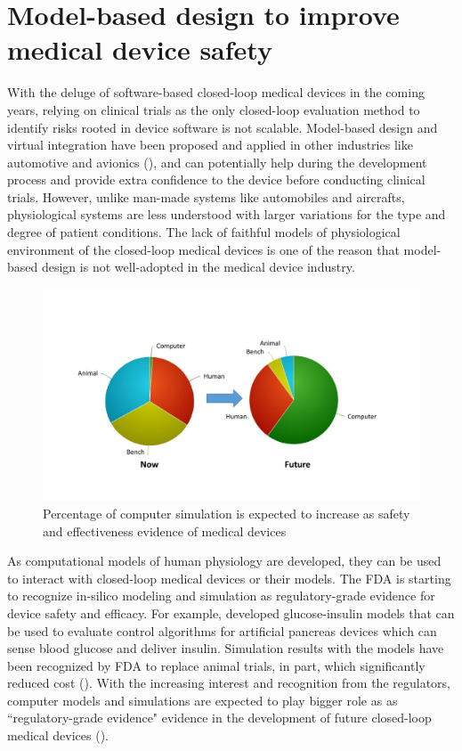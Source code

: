 \section{Model-based design to improve medical device safety}
With the deluge of software-based closed-loop medical devices in the coming years, relying on clinical trials as the only closed-loop evaluation method to identify risks rooted in device software is not scalable. Model-based design and virtual integration have been proposed and applied in other industries like automotive and avionics (\cite{autosar, avsi}), and can potentially help during the development process and provide extra confidence to the device before conducting clinical trials. However, unlike man-made systems like automobiles and aircrafts, physiological systems are less understood with larger variations for the type and degree of patient conditions. The lack of faithful models of physiological environment of the closed-loop medical devices is one of the reason that model-based design is not well-adopted in the medical device industry. 
\begin{figure}[t]
		\centering
		\includegraphics[width=\textwidth]{figs/MDIC.pdf}
		\caption{\small Percentage of computer simulation is expected to increase as safety and effectiveness evidence of medical devices}
		\label{fig:MDIC}
\end{figure}

As computational models of human physiology are developed, they can be used to interact with closed-loop medical devices or their models. The FDA is starting to recognize in-silico modeling and simulation as regulatory-grade evidence for device safety and efficacy. For example, \cite{pancreas_paul} developed glucose-insulin models that can be used to evaluate control algorithms for artificial pancreas devices which can sense blood glucose and deliver insulin. Simulation results with the models have been recognized by FDA to replace animal trials, in part, which significantly reduced cost (\cite{pancreas}). With the increasing interest and recognition from the regulators, computer models and simulations are expected to play bigger role as as ``regulatory-grade evidence" evidence in the development of future closed-loop medical devices ().


